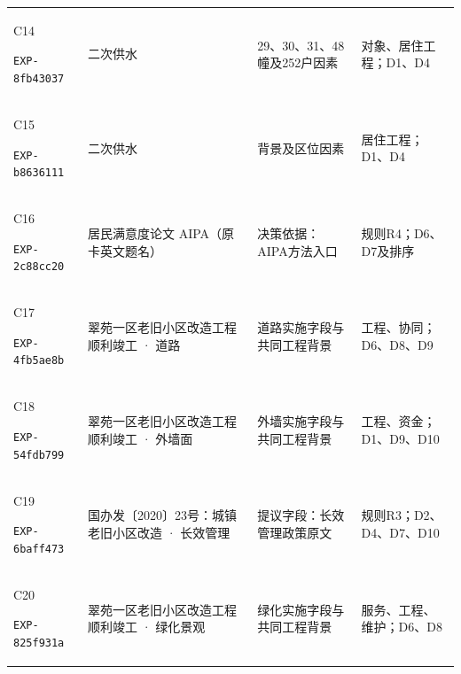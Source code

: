 \documentclass[UTF8,11pt,fontset=windows]{ctexart}
\begin{document}
{\begin{longtable}{@{}L{29mm}L{36mm}L{56mm}L{32mm}@{}}
\hypertarget{EXP-8fb43037-0680-4136-8844-edcb789391f4}{C14}\newline\texttt{EXP-8fb43037} & 二次供水 & 29、30、31、48幢及252户因素 & 对象、居住工程；D1、D4\\
\hypertarget{EXP-b8636111-04b9-40b3-9433-50e24dffe565}{C15}\newline\texttt{EXP-b8636111} & 二次供水 & 背景及区位因素 & 居住工程；D1、D4\\
\hypertarget{EXP-2c88cc20-e2d3-4a32-a176-e48d753a4712}{C16}\newline\texttt{EXP-2c88cc20} & 居民满意度论文 AIPA（原卡英文题名） & 决策依据：AIPA方法入口 & 规则R4；D6、D7及排序\\
\hypertarget{EXP-4fb5ae8b-4f8c-4b38-9f15-7fd612098a66}{C17}\newline\texttt{EXP-4fb5ae8b} & 翠苑一区老旧小区改造工程顺利竣工 · 道路 & 道路实施字段与共同工程背景 & 工程、协同；D6、D8、D9\\
\hypertarget{EXP-54fdb799-7504-45fd-bd7a-b619e98cf6cb}{C18}\newline\texttt{EXP-54fdb799} & 翠苑一区老旧小区改造工程顺利竣工 · 外墙面 & 外墙实施字段与共同工程背景 & 工程、资金；D1、D9、D10\\
\hypertarget{EXP-6baff473-93ed-4160-9a93-a0abf3c7b092}{C19}\newline\texttt{EXP-6baff473} & 国办发〔2020〕23号：城镇老旧小区改造 · 长效管理 & 提议字段：长效管理政策原文 & 规则R3；D2、D4、D7、D10\\
\hypertarget{EXP-825f931a-a8d3-49c2-9c42-e73bea9922e6}{C20}\newline\texttt{EXP-825f931a} & 翠苑一区老旧小区改造工程顺利竣工 · 绿化景观 & 绿化实施字段与共同工程背景 & 服务、工程、维护；D6、D8\\

\end{longtable}}
\end{document}
